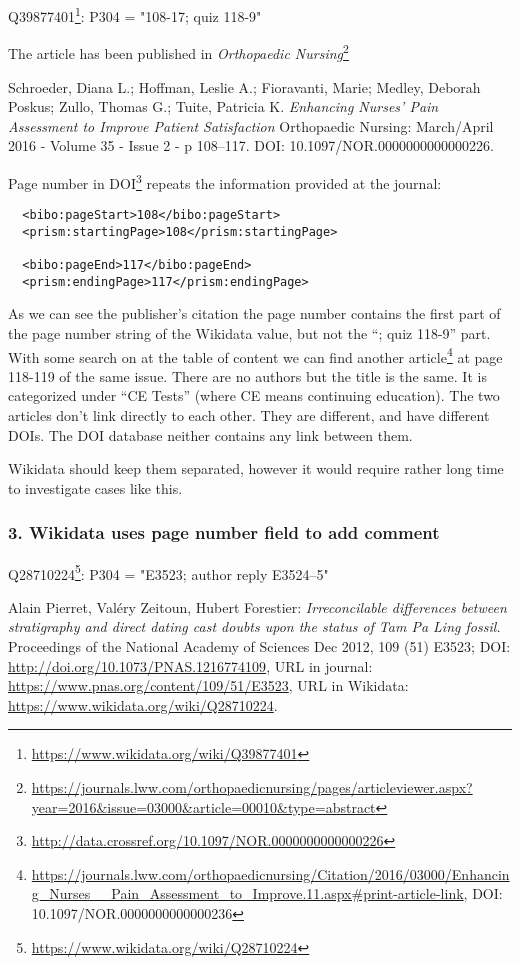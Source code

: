 Q39877401\footnote{\url{https://www.wikidata.org/wiki/Q39877401}}: P304 = "108-17; quiz 118-9"

The article has been published in \emph{Orthopaedic Nursing}\footnote{\url{https://journals.lww.com/orthopaedicnursing/pages/articleviewer.aspx?year=2016&issue=03000&article=00010&type=abstract}}

Schroeder, Diana L.; Hoffman, Leslie A.; Fioravanti, Marie; Medley, Deborah Poskus; Zullo, Thomas G.; Tuite, Patricia K. \emph{Enhancing Nurses' Pain Assessment to Improve Patient Satisfaction} Orthopaedic Nursing: March/April 2016 - Volume 35 - Issue 2 - p 108–117. DOI: 10.1097/NOR.0000000000000226.

Page number in DOI\footnote{\url{http://data.crossref.org/10.1097/NOR.0000000000000226}} repeats the information provided at the journal:

\begin{lstlisting}
  <bibo:pageStart>108</bibo:pageStart>
  <prism:startingPage>108</prism:startingPage>

  <bibo:pageEnd>117</bibo:pageEnd>
  <prism:endingPage>117</prism:endingPage>
\end{lstlisting}

As we can see the publisher's citation the page number contains the first part of the page number string of the Wikidata value, but not the ``; quiz 118-9'' part. With some search on at the table of content we can find another article\footnote{\url{https://journals.lww.com/orthopaedicnursing/Citation/2016/03000/Enhancing_Nurses__Pain_Assessment_to_Improve.11.aspx#print-article-link}, DOI: {10.1097/NOR.0000000000000236}} at page 118-119 of the same issue. There are no authors but the title is the same. It is categorized under ``CE Tests'' (where CE means continuing education). The two articles don't link directly to each other. They are different, and have different DOIs. The DOI database neither contains any link between them.

Wikidata should keep them separated, however it would require rather long time to investigate cases like this.

\subsubsection{3. Wikidata uses page number field to add comment}

Q28710224\footnote{\url{https://www.wikidata.org/wiki/Q28710224}}: P304 = "E3523; author reply E3524–5"

Alain Pierret, Valéry Zeitoun, Hubert Forestier: \emph{Irreconcilable differences between stratigraphy and direct dating cast doubts upon the status of Tam Pa Ling fossil.} Proceedings of the National Academy of Sciences Dec 2012, 109 (51) E3523; DOI: \url{http://doi.org/10.1073/PNAS.1216774109}, URL in journal: \url{https://www.pnas.org/content/109/51/E3523}, URL in Wikidata: \url{https://www.wikidata.org/wiki/Q28710224}.

